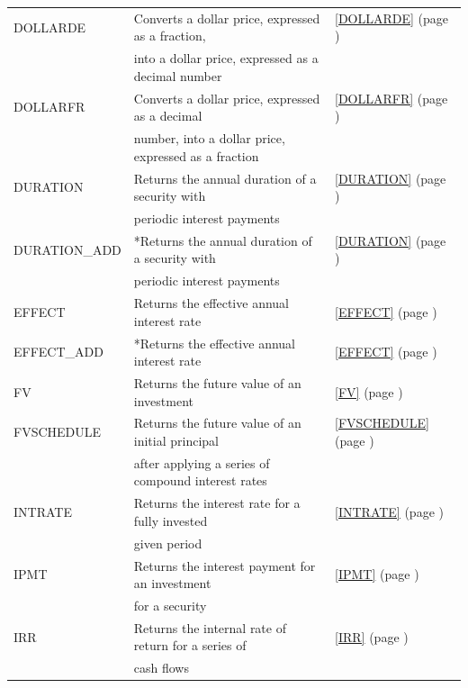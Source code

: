 \begin{center}
\begin{longtable}{l l l }
		DOLLARDE & Converts a dollar price, expressed as a fraction, &  \ref{DOLLARDE} (page \pageref{DOLLARDE}) \index{Spreadsheet Functions!DOLLARDE} \\
		& into a dollar price, expressed as a decimal number &   \\
		DOLLARFR & Converts a dollar price, expressed as a decimal &  \ref{DOLLARFR} (page \pageref{DOLLARFR}) \index{Spreadsheet Functions!DOLLARFR} \\
		& number, into a dollar price, expressed as a fraction &   \\
		DURATION & Returns the annual duration of a security with  &  \ref{DURATION} (page \pageref{DURATION}) \index{Spreadsheet Functions!DURATION} \\
		& periodic interest payments &   \\
		DURATION\_ADD & *Returns the annual duration of a security with &  \ref{DURATION} (page \pageref{DURATION}) \index{Spreadsheet Functions!DURATION} \\
		& periodic interest payments &   \\
		EFFECT & Returns the effective annual interest rate &  \ref{EFFECT} (page \pageref{EFFECT}) \index{Functions!EFFECT} \\
		EFFECT\_ADD & *Returns the effective annual interest rate &  \ref{EFFECT} (page \pageref{EFFECT}) \index{Spreadsheet Functions!EFFECT\_ADD} \\
		FV    & Returns the future value of an investment &  \ref{FV} (page \pageref{FV}) \index{Spreadsheet Functions!FV} \\
		FVSCHEDULE & Returns the future value of an initial principal &  \ref{FVSCHEDULE} (page \pageref{FVSCHEDULE}) \index{Spreadsheet Functions!FVSCHEDULE} \\
		& after applying a series of compound interest rates &   \\
		INTRATE & Returns the interest rate for a fully invested  &  \ref{INTRATE} (page \pageref{INTRATE}) \index{Spreadsheet Functions!INTRATE} \\
		& given period &   \\
		IPMT  & Returns the interest payment for an investment &  \ref{IPMT} (page \pageref{IPMT}) \index{Spreadsheet Functions!IPMT} \\
		& for a security &   \\
		IRR   & Returns the internal rate of return for a series of &  \ref{IRR} (page \pageref{IRR}) \index{Spreadsheet Functions!IRR} \\
		& cash flows &   \\

\end{longtable}
\end{center}
